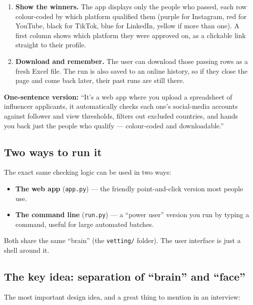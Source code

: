 \documentclass[11pt]{article}
\newcommand{\file}[1]{\texttt{\color{inkdark}#1}}
\begin{document}
\begin{enumerate}[leftmargin=1.6em, itemsep=5pt]
  \item \textbf{Show the winners.} The app displays only the people who passed,
  each row colour-coded by which platform qualified them (purple for Instagram,
  red for YouTube, black for TikTok, blue for LinkedIn, yellow if more than
  one). A first column shows which platform they were approved on, as a
  clickable link straight to their profile.

  \item \textbf{Download and remember.} The user can download those passing
  rows as a fresh Excel file. The run is also saved to an online history, so if
  they close the page and come back later, their past runs are still there.
\end{enumerate}

\begin{plainbox}
\textbf{One-sentence version:}
``It's a web app where you upload a spreadsheet of influencer applicants, it
automatically checks each one's social-media accounts against follower and view
thresholds, filters out excluded countries, and hands you back just the people
who qualify — colour-coded and downloadable.''
\end{plainbox}

\subsection{Two ways to run it}

The exact same checking logic can be used in two ways:

\begin{itemize}
  \item \textbf{The web app} (\file{app.py}) — the friendly point-and-click
  version most people use.
  \item \textbf{The command line} (\file{run.py}) — a ``power user'' version you
  run by typing a command, useful for large automated batches.
\end{itemize}

Both share the same ``brain'' (the \file{vetting/} folder). The user interface
is just a shell around it.

\subsection{The key idea: separation of ``brain'' and ``face''}

The most important design idea, and a great thing to mention in an interview:
\end{document}
